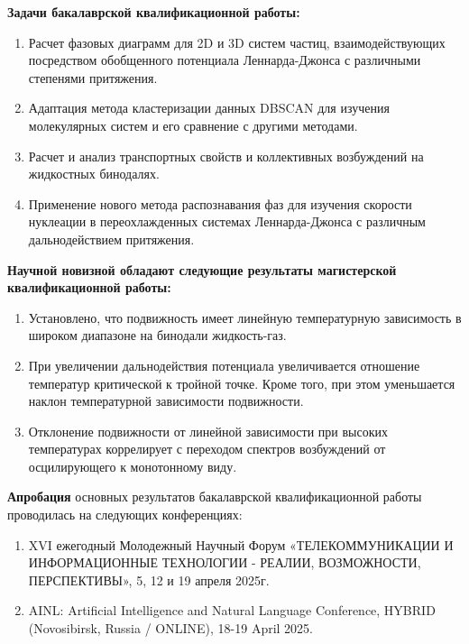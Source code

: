 \textbf{Задачи бакалаврской квалификационной работы:}
\begin{enumerate}
\item Расчет фазовых диаграмм для 2D и 3D систем частиц, взаимодействующих посредством обобщенного потенциала Леннарда-Джонса с различными степенями притяжения. 
\item Адаптация метода кластеризации данных DBSCAN для изучения молекулярных систем и его сравнение с другими методами.
\item Расчет и анализ транспортных свойств и коллективных возбуждений на жидкостных бинодалях.
\item Применение нового метода распознавания фаз для изучения скорости нуклеации в переохлажденных системах Леннарда-Джонса с различным дальнодействием притяжения. 
\end{enumerate}


\textbf{Научной новизной обладают следующие результаты магистерской
  квалификационной работы:}
\begin{enumerate}
\item Установлено, что подвижность имеет линейную температурную зависимость в широком диапазоне на бинодали жидкость-газ.
\item При увеличении дальнодействия потенциала увеличивается отношение температур критической к тройной точке.
  Кроме того, при этом уменьшается наклон температурной зависимости подвижности.
\item Отклонение подвижности от линейной зависимости при высоких температурах коррелирует с переходом спектров возбуждений от осцилирующего к монотонному виду.
\end{enumerate}


\textbf{Апробация} основных результатов бакалаврской квалификационной работы проводилась на следующих конференциях:
\begin{enumerate}
  \item XVI ежегодный Молодежный Научный Форум «ТЕЛЕКОММУНИКАЦИИ И ИНФОРМАЦИОННЫЕ ТЕХНОЛОГИИ - РЕАЛИИ, ВОЗМОЖНОСТИ, ПЕРСПЕКТИВЫ», 5, 12 и 19 апреля 2025г.
  \item AINL: Artificial Intelligence and Natural Language Conference, HYBRID (Novosibirsk, Russia / ONLINE), 18-19 April 2025.
\end{enumerate}
